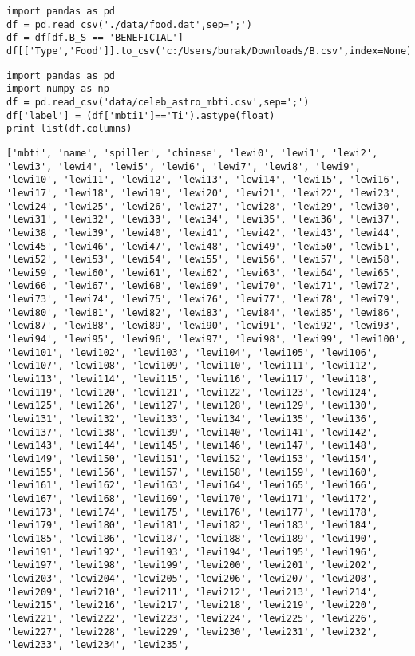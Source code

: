 \documentclass[12pt,fleqn]{article}\usepackage{../common}
\begin{document}
\begin{verbatim}
import pandas as pd
df = pd.read_csv('./data/food.dat',sep=';')
df = df[df.B_S == 'BENEFICIAL']
df[['Type','Food']].to_csv('c:/Users/burak/Downloads/B.csv',index=None)
\end{verbatim}

\begin{verbatim}
import pandas as pd
import numpy as np
df = pd.read_csv('data/celeb_astro_mbti.csv',sep=';')
df['label'] = (df['mbti1']=='Ti').astype(float)
print list(df.columns)
\end{verbatim}

\begin{verbatim}
['mbti', 'name', 'spiller', 'chinese', 'lewi0', 'lewi1', 'lewi2', 'lewi3', 'lewi4', 'lewi5', 'lewi6', 'lewi7', 'lewi8', 'lewi9', 'lewi10', 'lewi11', 'lewi12', 'lewi13', 'lewi14', 'lewi15', 'lewi16', 'lewi17', 'lewi18', 'lewi19', 'lewi20', 'lewi21', 'lewi22', 'lewi23', 'lewi24', 'lewi25', 'lewi26', 'lewi27', 'lewi28', 'lewi29', 'lewi30', 'lewi31', 'lewi32', 'lewi33', 'lewi34', 'lewi35', 'lewi36', 'lewi37', 'lewi38', 'lewi39', 'lewi40', 'lewi41', 'lewi42', 'lewi43', 'lewi44', 'lewi45', 'lewi46', 'lewi47', 'lewi48', 'lewi49', 'lewi50', 'lewi51', 'lewi52', 'lewi53', 'lewi54', 'lewi55', 'lewi56', 'lewi57', 'lewi58', 'lewi59', 'lewi60', 'lewi61', 'lewi62', 'lewi63', 'lewi64', 'lewi65', 'lewi66', 'lewi67', 'lewi68', 'lewi69', 'lewi70', 'lewi71', 'lewi72', 'lewi73', 'lewi74', 'lewi75', 'lewi76', 'lewi77', 'lewi78', 'lewi79', 'lewi80', 'lewi81', 'lewi82', 'lewi83', 'lewi84', 'lewi85', 'lewi86', 'lewi87', 'lewi88', 'lewi89', 'lewi90', 'lewi91', 'lewi92', 'lewi93', 'lewi94', 'lewi95', 'lewi96', 'lewi97', 'lewi98', 'lewi99', 'lewi100', 'lewi101', 'lewi102', 'lewi103', 'lewi104', 'lewi105', 'lewi106', 'lewi107', 'lewi108', 'lewi109', 'lewi110', 'lewi111', 'lewi112', 'lewi113', 'lewi114', 'lewi115', 'lewi116', 'lewi117', 'lewi118', 'lewi119', 'lewi120', 'lewi121', 'lewi122', 'lewi123', 'lewi124', 'lewi125', 'lewi126', 'lewi127', 'lewi128', 'lewi129', 'lewi130', 'lewi131', 'lewi132', 'lewi133', 'lewi134', 'lewi135', 'lewi136', 'lewi137', 'lewi138', 'lewi139', 'lewi140', 'lewi141', 'lewi142', 'lewi143', 'lewi144', 'lewi145', 'lewi146', 'lewi147', 'lewi148', 'lewi149', 'lewi150', 'lewi151', 'lewi152', 'lewi153', 'lewi154', 'lewi155', 'lewi156', 'lewi157', 'lewi158', 'lewi159', 'lewi160', 'lewi161', 'lewi162', 'lewi163', 'lewi164', 'lewi165', 'lewi166', 'lewi167', 'lewi168', 'lewi169', 'lewi170', 'lewi171', 'lewi172', 'lewi173', 'lewi174', 'lewi175', 'lewi176', 'lewi177', 'lewi178', 'lewi179', 'lewi180', 'lewi181', 'lewi182', 'lewi183', 'lewi184', 'lewi185', 'lewi186', 'lewi187', 'lewi188', 'lewi189', 'lewi190', 'lewi191', 'lewi192', 'lewi193', 'lewi194', 'lewi195', 'lewi196', 'lewi197', 'lewi198', 'lewi199', 'lewi200', 'lewi201', 'lewi202', 'lewi203', 'lewi204', 'lewi205', 'lewi206', 'lewi207', 'lewi208', 'lewi209', 'lewi210', 'lewi211', 'lewi212', 'lewi213', 'lewi214', 'lewi215', 'lewi216', 'lewi217', 'lewi218', 'lewi219', 'lewi220', 'lewi221', 'lewi222', 'lewi223', 'lewi224', 'lewi225', 'lewi226', 'lewi227', 'lewi228', 'lewi229', 'lewi230', 'lewi231', 'lewi232', 'lewi233', 'lewi234', 'lewi235', 
\end{verbatim}
\end{document}

